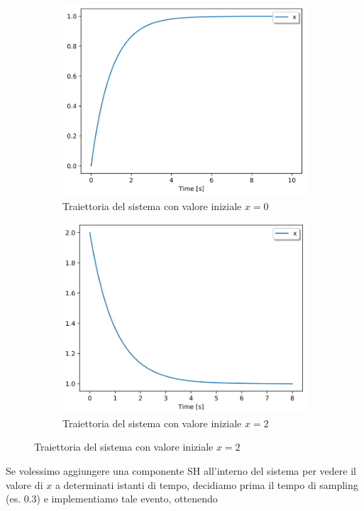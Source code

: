 \begin{figure}[h]
    \centering
    \begin{subfigure}[b]{0.4\textwidth}
        \includegraphics[width=\textwidth]{Intro/FirstOrderSystem_a.png}
        \caption{Traiettoria del sistema con valore iniziale $x=0$}
        \label{fig:my_label}
    \end{subfigure}
    \begin{subfigure}[b]{0.4\textwidth}
        \includegraphics[width=\textwidth]{Intro/FirstOrderSystem_b.png}
        \caption{Traiettoria del sistema con valore iniziale $x=2$}
        \label{fig:my_label}
    \end{subfigure}
\end{figure}
Se volessimo aggiungere una componente SH all'interno del sistema per vedere il valore di $x$ a determinati istanti di tempo, decidiamo prima il tempo di sampling (es. 0.3) e implementiamo tale evento, ottenendo

